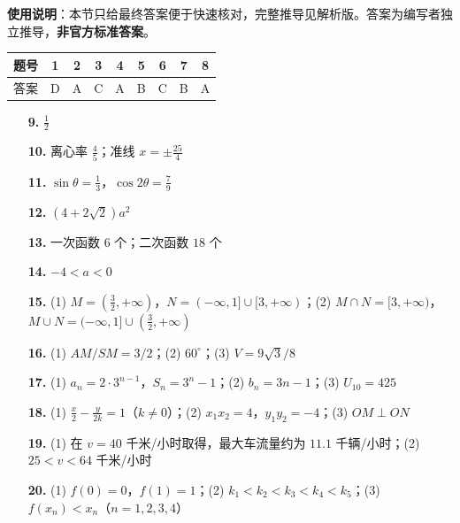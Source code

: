
\begin{gknotice}
\textbf{使用说明}：本节只给最终答案便于快速核对，完整推导见解析版。答案为编写者独立推导，\textbf{非官方标准答案}。
\end{gknotice}

\begin{center}\begin{tabular}{ccccccccc}
\toprule
题号 & 1 & 2 & 3 & 4 & 5 & 6 & 7 & 8 \\
\midrule
答案 & D & A & C & A & B & C & B & A \\
\bottomrule
\end{tabular}\end{center}

\begin{itemize}[leftmargin=2.6em]
  \item[\textbf{9.}] $\frac12$
  \item[\textbf{10.}] 离心率 $\frac45$；准线 $x=\pm\frac{25}{4}$
  \item[\textbf{11.}] $\sin\theta=\frac13$，$\cos2\theta=\frac79$
  \item[\textbf{12.}] $(4+2\sqrt2)a^2$
  \item[\textbf{13.}] 一次函数 $6$ 个；二次函数 $18$ 个
  \item[\textbf{14.}] $-4<a<0$
\end{itemize}

\begin{itemize}[leftmargin=2.6em]
  \item[\textbf{15.}] (1) $M=(\frac32,+\infty)$，$N=(-\infty,1]\cup[3,+\infty)$；(2) $M\cap N=[3,+\infty)$，$M\cup N=(-\infty,1]\cup(\frac32,+\infty)$
  \item[\textbf{16.}] (1) $AM/SM=3/2$；(2) $60^\circ$；(3) $V=9\sqrt3/8$
  \item[\textbf{17.}] (1) $a_n=2\cdot3^{n-1}$，$S_n=3^n-1$；(2) $b_n=3n-1$；(3) $U_{10}=425$
  \item[\textbf{18.}] (1) $\frac{x}{2}-\frac{y}{2k}=1$（$k\ne0$）；(2) $x_1x_2=4$，$y_1y_2=-4$；(3) $OM\perp ON$
  \item[\textbf{19.}] (1) 在 $v=40$ 千米/小时取得，最大车流量约为 $11.1$ 千辆/小时；(2) $25<v<64$ 千米/小时
  \item[\textbf{20.}] (1) $f(0)=0$，$f(1)=1$；(2) $k_1<k_2<k_3<k_4<k_5$；(3) $f(x_n)<x_n$（$n=1,2,3,4$）
\end{itemize}
